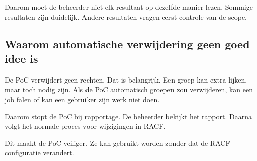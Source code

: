 Daarom moet de beheerder niet elk resultaat op dezelfde manier lezen. Sommige resultaten zijn duidelijk. Andere resultaten vragen eerst controle van de scope.

\subsection*{Waarom automatische verwijdering geen goed idee is}

De PoC verwijdert geen rechten. Dat is belangrijk. Een groep kan extra lijken, maar toch nodig zijn. Als de PoC automatisch groepen zou verwijderen, kan een job falen of kan een gebruiker zijn werk niet doen.

Daarom stopt de PoC bij rapportage. De beheerder bekijkt het rapport. Daarna volgt het normale proces voor wijzigingen in RACF.

Dit maakt de PoC veiliger. Ze kan gebruikt worden zonder dat de RACF configuratie verandert.
